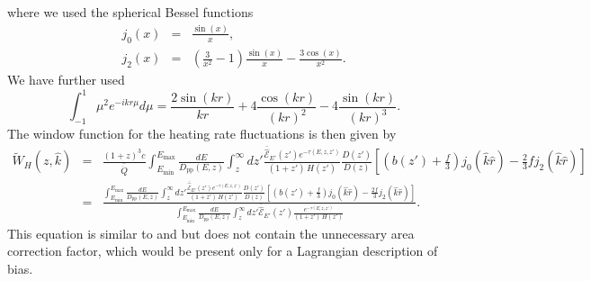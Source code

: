 \documentclass[numberedappendix]{emulateapj}
\newcommand\ALc[1]{{\color{red} \bf #1}} %
\begin{document}
where we used the spherical Bessel functions
\begin{eqnarray}
\label{eq:bessel}
j_0(x)&=& \frac{\sin(x)}{x},\\
j_2(x)&=& \left(\frac{3}{x^2}-1\right)\frac{\sin(x)}{x}-\frac{3 \cos(x)}{x^2} .
\end{eqnarray}
We have further used
\begin{equation}
\label{eq:bes2}
\int_{-1}^{1}\mu^2 e^{-i k r \mu} d\mu=\frac{2 \sin(kr)}{kr}+4\frac{\cos(kr)}{(kr)^2}-4\frac{\sin(kr)}{(kr)^3}.
\end{equation}
The window function for the heating rate fluctuations is then given by
\begin{eqnarray}
\label{eq:heat_fluc}
\tilde{W}_H(z,\hat k)&=&\frac{(1+z)^3c }{\bar{\dot{Q}}}\int_{E_{\mathrm{min}}}^{E_{\mathrm{max}}} \frac{dE}{D_{\mathrm{pp}}(E,z)}\int_z^{\infty} dz' \frac{\mathcal{\bar{\hat E}}_{E'}(z')e^{-\tau(E,z,z')}}{(1+z')\,H(z')}\frac{D(z')}{D(z)}\left[\left(b(z')+\frac{f}{3}\right)j_0(\hat k \hat r)-\frac{2}{3}f j_2(\hat k \hat r)\right]\\
&=& \frac{\displaystyle \int_{E_{\mathrm{min}}}^{E_{\mathrm{max}}} \frac{dE}{{D_{\mathrm{pp}}}(E,z)}\int_z^{\infty} dz'   \frac{\mathcal{\bar{\hat E}}_{E'}(z')e^{-\tau(E,z,z')}}{(1+z')\,H(z')}\frac{D(z')}{D(z)}\left[\left(b(z')+\frac{f}{3}\right)j_0(\hat k \hat r)-\frac{2f}{3}j_2(\hat k \hat r)\right]}{\displaystyle \int_{E_{\mathrm{min}}}^{E_{\mathrm{max}}} \frac{dE}{{D_{\mathrm{pp}}}(E,z)}\int_z^{\infty} dz'  \mathcal{\bar{\hat E}}_{E'}(z') \frac{e^{-\tau(E,z,z')}}{(1+z')\,H(z')}}.
\end{eqnarray}
This equation is similar to \citet{2007MNRAS.376.1680P} and \citet{2005ApJ...626....1B} but does not contain the unnecessary area correction factor, which would be present only for a Lagrangian description of bias.


\end{document}
